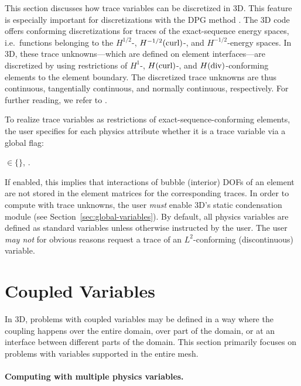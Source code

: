 This section discusses how trace variables can be discretized in \hp3D. This feature is especially important for discretizations with the DPG method \cite{demkowicz2017dpg}. The \hp3D code offers conforming discretizations for traces of the exact-sequence energy spaces, i.e.~functions belonging to the $H^{1/2}$-, $H^{-1/2}(\text{curl})$-, and $H^{-1/2}$-energy spaces. In \hp3D, these trace unknowns---which are defined on element interfaces---are discretized by using restrictions of $H^1$-, $H(\text{curl})$-, and $H(\text{div})$-conforming elements to the element boundary. The discretized trace unknowns are thus continuous, tangentially continuous, and normally continuous, respectively. For further reading, we refer to \cite{demkowicz2018spaces,demkowicz2020fem}.

To realize trace variables as restrictions of exact-sequence-conforming elements, the user specifies for each physics attribute whether it is a trace variable via a global flag:

 $\in \{$$\}$, .

\noindent
If enabled, this implies that interactions of bubble (interior) DOFs of an element are not stored in the element matrices for the corresponding traces. In order to compute with trace unknowns, the user \emph{must} enable \hp3D's static condensation module  (see Section~\ref{sec:global-variables}). By default, all physics variables are defined as standard variables unless otherwise instructed by the user. The user \emph{may not} for obvious reasons request a trace of an $L^2$-conforming (discontinuous) variable.

\section{Coupled Variables}
\label{sec:coupled-variables}

In \hp3D, problems with coupled variables may be defined in a way where the coupling happens over the entire domain, over part of the domain, or at an interface between different parts of the domain. This section primarily focuses on problems with variables supported in the entire mesh.

\paragraph{Computing with multiple physics variables.}

